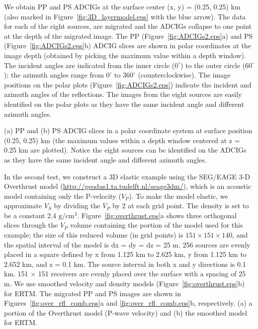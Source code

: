 \documentclass[manuscript,ulem,graphix,revised]{geophysics}
\begin{document}
We obtain PP and PS ADCIGs at the surface center (x, y) = (0.25, 0.25) km (also marked in Figure~\ref{fig:3D_layermodel.eps} with the blue arrow).  The data for each of the eight sources, are migrated and the ADCIGs collapse to one point at the depth of the migrated image. 
The PP (Figure~\ref{fig:ADCIGs2.eps}a) and PS (Figure~\ref{fig:ADCIGs2.eps}b) ADCIG slices are shown in polar coordinates at the image depth (obtained by picking the maximum value within a depth window). The incident angles are indicated from the inner circle ($0^{\circ}$) to the outer circle ($60^{\circ}$); the azimuth angles range from $0^{\circ}$ to $360^{\circ}$ (counterclockwise). The image positions on the polar plots (Figure~\ref{fig:ADCIGs2.eps}) indicate the incident and azimuth angles of the reflections. The images from the eight sources are easily identified on the polar plots as they have the same incident angle and different azimuth angles. 


{
(a) PP and (b) PS ADCIG slices in a polar coordinate system at surface position (0.25, 0.25) km (the maximum values within a depth window centered at z = 0.25 km are plotted).  Notice the eight sources can be identified on the ADCIGs as they have the same incident angle and different azimuth angles.
}

In the second test, we construct a 3D elastic example using the SEG/EAGE 3-D Overthrust model (\url{http://geodus1.ta.tudelft.nl/seage3dm/}), which is an acoustic model containing only the P-velocity ($V_{P}$). To make the model elastic, we approximate $V_{S}$ by dividing the $V_{P}$ by 2 at each grid point.  The density is set to be a constant 2.4 $\mathrm{g/cm^3}$. Figure~\ref{fig:overthrust.eps}a shows three orthogonal slices through the $V_{P}$ volume containing the portion of the model used for this example; the size of this reduced volume (in grid points) is $151\times 151 \times 140$, and the spatial interval of the model is dx = dy = dz = 25 m. 256 sources are evenly placed in a square defined by x from 1.125 km to 2.625 km, y from 1.125 km to 2.652 km, and z = 0.1 km. The source interval in both x and y directions is 0.1 km. 151 $\times$ 151 receivers are evenly placed over the surface with a spacing of 25 m.
We use smoothed velocity and density models (Figure~\ref{fig:overthrust.eps}b) for ERTM.  The migrated PP and PS images are shown in Figures~\ref{fig:over_rfl_comb.eps}a and \ref{fig:over_rfl_comb.eps}b, respectively.
{
(a) a portion of the Overthrust model (P-wave velocity) and (b) the smoothed model for ERTM.
}
\end{document}
